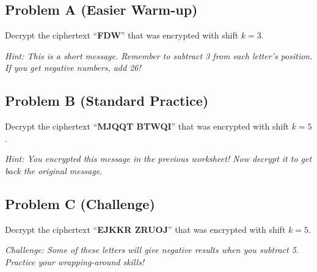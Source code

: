 \documentclass[12pt]{article}
\begin{document}
\subsection*{Problem A (Easier Warm-up)}

Decrypt the ciphertext ``\textbf{FDW}'' that was encrypted with shift $k=3$.

\vspace{0.3cm}
\noindent\textit{Hint: This is a short message. Remember to subtract 3 from each letter's position. If you get negative numbers, add 26!}

\vspace{5cm}

\subsection*{Problem B (Standard Practice)}

Decrypt the ciphertext ``\textbf{MJQQT BTWQI}'' that was encrypted with shift $k=5$.

\vspace{0.3cm}
\noindent\textit{Hint: You encrypted this message in the previous worksheet! Now decrypt it to get back the original message.}

\vspace{6cm}

\subsection*{Problem C (Challenge)}

Decrypt the ciphertext ``\textbf{EJKKR ZRUOJ}'' that was encrypted with shift $k=5$.

\vspace{0.3cm}
\noindent\textit{Challenge: Some of these letters will give negative results when you subtract 5. Practice your wrapping-around skills!}

\vspace{6cm}
\end{document}
